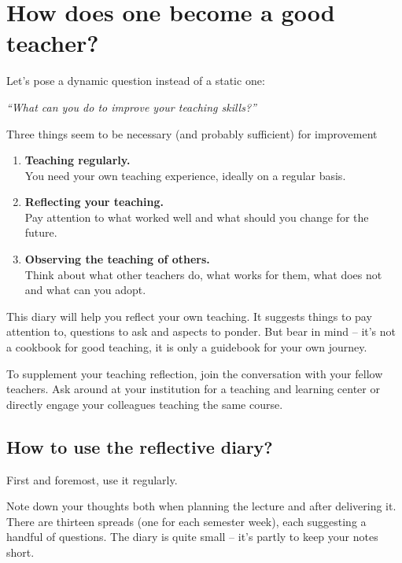 
\chapter*{How does one become a good teacher?}

\vspace*{1em}
Let's pose a dynamic question instead of a static one:

\vspace*{1em}
\textit{\large \enquote{What can you do to improve your teaching skills?}}

\vspace*{1em}
Three things seem to be necessary (and probably sufficient) for improvement\footnotemark
{}
\begin{enumerate}
\item \textbf{Teaching regularly.}\\You need your own teaching experience, ideally on a regular basis.
\item \textbf{Reflecting your teaching.}\\Pay attention to what worked well and what should you change for the future.
\item \textbf{Observing the teaching of others.}\\Think about what other teachers do, what works for them, what does not and what can you adopt.
\end{enumerate}

This diary will help you reflect your own teaching. It suggests things to pay attention to, questions to ask and aspects to ponder. But bear in mind -- it's not a cookbook for good teaching, it is only a guidebook for your own journey.

To supplement your teaching reflection, join the conversation with your fellow teachers. Ask around at your institution for a teaching and learning center or directly engage your colleagues teaching the same course.

\newpage
\section*{How to use the reflective diary?}

First and foremost, use it regularly.

Note down your thoughts both when planning the lecture and after delivering it. There are thirteen spreads (one for each semester week), each suggesting a handful of questions. The diary is quite small -- it's partly to keep your notes short.

